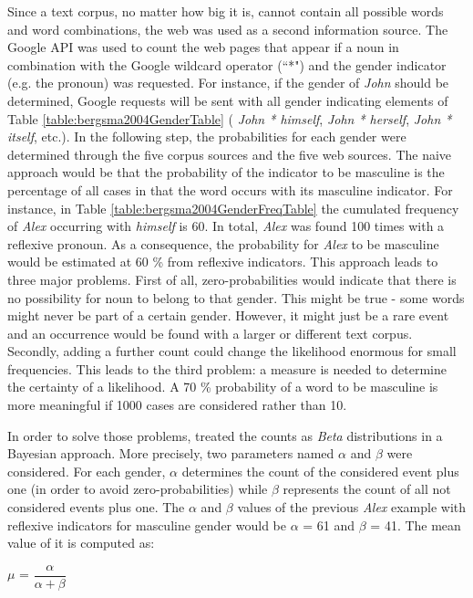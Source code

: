 Since a text corpus, no matter how big it is, cannot contain all possible words and word combinations, the web was used as a second information source. The Google API was used to count the web pages that appear if a noun in combination with the Google wildcard operator (``*") and the gender indicator (e.g. the pronoun) was requested. For instance, if the gender of \textit{John} should be determined, Google requests will be sent with all gender indicating elements of Table \ref{table:bergsma2004GenderTable} ( \textit{John * himself}, \textit{John * herself}, \textit{John * itself}, etc.).
In the following step, the probabilities for each gender were determined through the five corpus sources and the five web sources. The naive approach would be that the probability of the indicator to be masculine is the percentage of all cases in that the word occurs with its masculine indicator. For instance, in Table \ref{table:bergsma2004GenderFreqTable} the cumulated frequency of \textit{Alex} occurring with \textit{himself} is 60. In total, \textit{Alex} was found 100 times with a reflexive pronoun. As a consequence, the probability for \textit{Alex} to be masculine would be estimated at 60 \% from reflexive indicators.
This approach leads to three major problems. First of all, zero-probabilities would indicate that there is no possibility for noun to belong to that gender. This might be true - some words might never be part of a certain gender. However, it might just be a rare event and an occurrence would be found with a larger or different text corpus. Secondly, adding a further count could change the likelihood enormous for small frequencies. This leads to the third problem: a measure is needed to determine the certainty of a likelihood. A 70 \% probability of a word to be masculine is more meaningful if 1000 cases are considered rather than 10. 
 
In order to solve those problems, \cite{bergsma2005automatic} treated the counts as \textit{Beta} distributions in a Bayesian approach. More precisely, two parameters named $\alpha$ and $\beta$ were considered. For each gender, $\alpha$ determines the count of the considered event plus one (in order to avoid zero-probabilities) while $\beta$ represents the count of all not considered events plus one. The $\alpha$ and $\beta$ values of the previous \textit{Alex} example with reflexive indicators for masculine gender would be $\alpha$ = 61 and $\beta$ = 41. The mean value of it is computed as:
\begin{center}
	 $\mu$ =  $\dfrac{\alpha }{\alpha + \beta}$  
\end{center}

